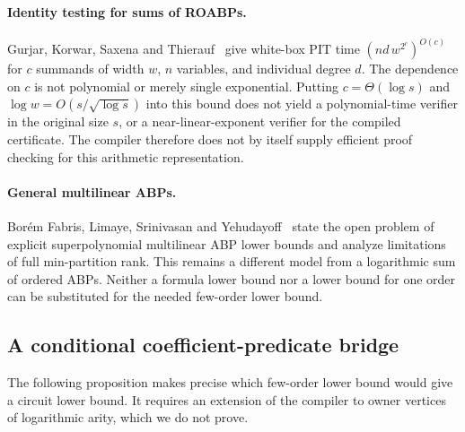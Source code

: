 \documentclass[11pt]{article}
\theoremstyle{definition}
\theoremstyle{remark}
\begin{document}
\paragraph{Identity testing for sums of ROABPs.}
Gurjar, Korwar, Saxena and Thierauf~\cite[Theorem~3.2]{GKST15} give
white-box PIT time $(nd\,w^{2^c})^{O(c)}$ for $c$ summands of width $w$,
$n$ variables, and individual degree $d$.
The dependence on $c$ is not polynomial or merely single exponential.
Putting $c=\Theta(\log s)$ and $\log w=O(s/\sqrt{\log s})$ into this
bound does not yield a polynomial-time verifier in the original size
$s$, or a near-linear-exponent verifier for the compiled certificate.
The compiler therefore does not by itself supply efficient proof
checking for this arithmetic representation.

\paragraph{General multilinear ABPs.}
Bor\'em Fabris, Limaye, Srinivasan and
Yehudayoff~\cite[Question~1 and Theorems~3 and~7]{FLSY26} state the
open problem
of explicit superpolynomial multilinear ABP lower bounds and analyze
limitations of full min-partition rank.  This remains a different
model from a logarithmic sum of ordered ABPs.
Neither a formula lower bound nor a lower bound for one order can
be substituted for the needed few-order lower bound.

\subsection{A conditional coefficient-predicate bridge}

The following proposition makes precise which few-order lower bound
would give a circuit lower bound. It requires an extension of the
compiler to owner vertices of logarithmic arity, which we do not
prove.
\end{document}
